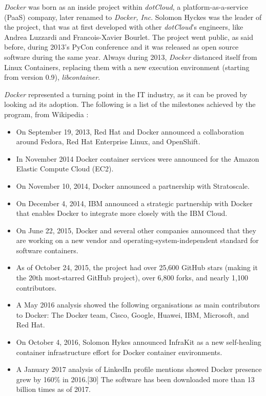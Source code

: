\documentclass[a4paper,12pt]{article}
\begin{document}
\textit{Docker} was born as an inside project within \textit{dotCloud}, a
platform-as-a-service (PaaS) company, later renamed to \textit{Docker, Inc}.
Solomon Hyckes \cite{solomon_hyckes_wiki} was the leader of the project, that was
at first developed with other \textit{dotCloud}'s engineers, like Andrea
Luzzardi and Francois-Xavier Bourlet. The project went public, as said before,
during 2013's PyCon conference and it was released as open source software
during the same year. Always during 2013, \textit{Docker} distanced itself from
Linux Containers, replacing them with a new execution environment (starting from
version 0.9), \textit{libcontainer}.\par \textit{Docker} represented a turning
point in the IT industry, as it can be proved by looking ad its adoption. The
following is a list of the milestones achieved by the program, from
Wikipedia \cite{docker_history_wiki}:
\begin{itemize}
  \item On September 19, 2013, Red Hat and Docker announced a collaboration
  around Fedora, Red Hat Enterprise Linux, and OpenShift.
  \item In November 2014 Docker container services were announced for the Amazon
  Elastic Compute Cloud (EC2).
  \item On November 10, 2014, Docker announced a partnership with
  Stratoscale.
  \item On December 4, 2014, IBM announced a strategic partnership with Docker
  that enables Docker to integrate more closely with the IBM Cloud.
  \item On June 22, 2015, Docker and several other companies announced that they
  are working on a new vendor and operating-system-independent standard for
  software containers.
  \item As of October 24, 2015, the project had over 25,600 GitHub stars (making
  it the 20th most-starred GitHub project), over 6,800 forks, and nearly 1,100
  contributors.
  \item A May 2016 analysis showed the following organisations as main
  contributors to Docker: The Docker team, Cisco, Google, Huawei, IBM,
  Microsoft, and Red Hat.
  \item On October 4, 2016, Solomon Hykes announced InfraKit as a new
  self-healing container infrastructure effort for Docker container
  environments.
  \item A January 2017 analysis of LinkedIn profile mentions showed Docker
  presence grew by 160\% in 2016.[30] The software has been downloaded more than
  13 billion times as of 2017.

\end{itemize}   
\end{document}
